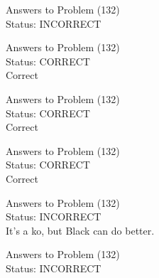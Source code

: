 \documentclass[11pt]{article}
\begin{document}
\begin{minipage}[t]{0.5\textwidth}
  {\centering
  
  Answers to Problem (132)\\
  Status: INCORRECT\\
  
  }
\end{minipage}
\begin{minipage}[t]{0.5\textwidth}
  {\centering
  
  Answers to Problem (132)\\
  Status: CORRECT\\
  Correct\\
  }
\end{minipage}
\begin{minipage}[t]{0.5\textwidth}
  {\centering
  
  Answers to Problem (132)\\
  Status: CORRECT\\
  Correct\\
  }
\end{minipage}
\begin{minipage}[t]{0.5\textwidth}
  {\centering
  
  Answers to Problem (132)\\
  Status: CORRECT\\
  Correct\\
  }
\end{minipage}
\begin{minipage}[t]{0.5\textwidth}
  {\centering
  
  Answers to Problem (132)\\
  Status: INCORRECT\\
  It's a ko, but Black can do better.\\
  }
\end{minipage}
\begin{minipage}[t]{0.5\textwidth}
  {\centering
  
  Answers to Problem (132)\\
  Status: INCORRECT\\
  
  }
\end{minipage}
\end{document}
